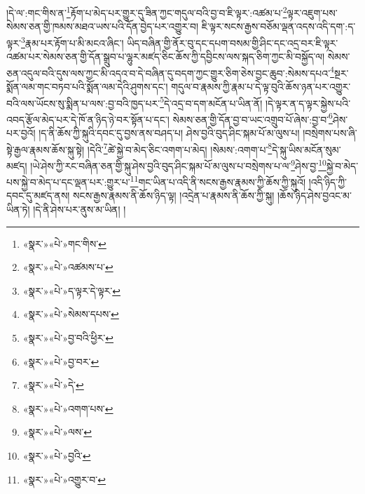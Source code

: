 །དེ་ལ་:གང་གིས་ན་\footnote{«སྣར་»«པེ་»གང་གིས་}རྟོག་པ་མེད་པར་གྱུར་དུ་ཟིན་ཀྱང་གདུལ་བའི་བྱ་བ་ཇི་ལྟར་:འཚམ་པ་\footnote{«སྣར་»«པེ་»འཚམས་པ་}ལྟར་འཇུག་པས་སེམས་ཅན་གྱི་ཁམས་མཐའ་ཡས་པའི་དོན་བྱེད་པར་འགྱུར་བ། ཇི་ལྟར་སངས་རྒྱས་བཅོམ་ལྡན་འདས་འདི་དག་:ད་ལྟར་\footnote{«སྣར་»«པེ་»ད་ལྟར་དེ་ལྟར་}རྣམ་པར་རྟོག་པ་མི་མངའ་ཞིང་། ཡིད་བཞིན་གྱི་ནོར་བུ་དང་དཔག་བསམ་གྱི་ཤིང་དང་འདྲ་བར་ཇི་ལྟར་འཚམ་པར་སེམས་ཅན་གྱི་དོན་སྒྲུབ་པ་ལྷུར་མཛད་ཅིང་ཆོས་ཀྱི་དབྱིངས་ལས་སྐད་ཅིག་ཀྱང་མི་བསྐྱོད་ལ། སེམས་ཅན་འདུལ་བའི་དུས་ལས་ཀྱང་མི་འདའ་བ་དེ་བཞིན་དུ་བདག་ཀྱང་གྱུར་ཅིག་ཅེས་བྱང་ཆུབ་:སེམས་དཔའ་\footnote{«སྣར་»«པེ་»སེམས་དཔས་}སྔར་སྨོན་ལམ་གང་བཏབ་པའི་སྨོན་ལམ་དེའི་ཤུགས་དང་། གདུལ་བ་རྣམས་ཀྱི་རྣམ་པ་དེ་ལྟ་བུའི་ཆོས་ཉན་པར་འགྱུར་བའི་ལས་ཡོངས་སུ་སྨིན་པ་ལས་:བྱ་བའི་ཁྱད་པར་\footnote{«སྣར་»«པེ་»བྱ་བའི་ཕྱིར་}དེ་འདྲ་བ་དག་མངོན་པ་ཡིན་ནོ། །དེ་ལྟར་ན་ད་ལྟར་སྐྱེས་པའི་འབད་རྩོལ་མེད་པར་དེ་ཁོ་ན་ཉིད་ཉེ་བར་སྟོན་པ་དང་། སེམས་ཅན་གྱི་དོན་བྱ་བ་ཡང་འགྲུབ་པོ་ཞེས་:བྱ་བ་\footnote{«སྣར་»«པེ་»བྱ་བར་}ཤེས་པར་བྱའོ། །ད་ནི་ཆོས་ཀྱི་སྐུའི་དབང་དུ་བྱས་ནས་བཤད་པ། ཤེས་བྱའི་བུད་ཤིང་སྐམ་པོ་མ་ལུས་པ། །བསྲེགས་པས་ཞི་སྟེ་རྒྱལ་རྣམས་ཆོས་སྐུ་སྟེ། །དེའི་\footnote{«སྣར་»«པེ་»དེ་}ཚེ་སྐྱེ་བ་མེད་ཅིང་འགག་པ་མེད། །སེམས་:འགག་པ་\footnote{«སྣར་»«པེ་»འགག་པས་}དེ་སྐུ་ཡིས་མངོན་སུམ་མཛད། །ཡེ་ཤེས་ཀྱི་རང་བཞིན་ཅན་གྱི་སྐུ་ཤེས་བྱའི་བུད་ཤིང་སྐམ་པོ་མ་ལུས་པ་བསྲེགས་པ་ལ་\footnote{«སྣར་»«པེ་»ལས་}ཤེས་བྱ་\footnote{«སྣར་»«པེ་»བྱའི་}སྐྱེ་བ་མེད་པས་སྐྱེ་བ་མེད་པ་དང་ལྡན་པར་:གྱུར་པ་\footnote{«སྣར་»«པེ་»འགྱུར་བ་}གང་ཡིན་པ་འདི་ནི་སངས་རྒྱས་རྣམས་ཀྱི་ཆོས་ཀྱི་སྐུའོ། །འདི་ཉིད་ཀྱི་དབང་དུ་མཛད་ནས། སངས་རྒྱས་རྣམས་ནི་ཆོས་ཉིད་ལྟ། །འདྲེན་པ་རྣམས་ནི་ཆོས་ཀྱི་སྐུ། །ཆོས་ཉིད་ཤེས་བྱའང་མ་ཡིན་ཏེ། །དེ་ནི་ཤེས་པར་ནུས་མ་ཡིན། །
